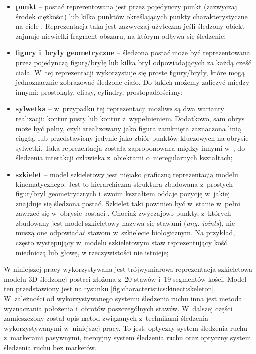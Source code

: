 \begin{itemize}
	\item \textbf{punkt} -- postać reprezentowana jest przez pojedynczy punkt (zazwyczaj środek ciężkości) \cite{Veenman2001} lub kilka punktów określających punkty charakterystyczne na ciele \cite{Serby2004}. Reprezentacja taka jest zazwyczaj użyteczna jeśli śledzony obiekt zajmuje niewielki fragment obszaru, na którym odbywa się śledzenie;
	\item \textbf{figury i~bryły geometryczne} -- śledzona postać może być reprezentowana przez pojedynczą figurę/bryłę \cite{Comaniciu2003} lub kilka brył odpowiadających za każdą cześć ciała. W~tej reprezentacji wykorzystuje się proste figury/bryły, które mogą jednoznacznie zobrazować śledzone ciało. Do takich możemy zaliczyć między innymi: prostokąty, elipsy, cylindry, prostopadłościany;
	\item \textbf{sylwetka} -- w~przypadku tej reprezentacji możliwe są dwa warianty realizacji: kontur pusty lub kontur z~wypełnieniem. Dodatkowo, sam obrys może być pełny, czyli zrealizowany jako figura zamknięta zaznaczona linią ciągłą, lub przedstawiony jedynie jako zbiór punktów kluczowych na obrysie sylwetki. Taka reprezentacja została zaproponowana między innymi w~\cite{Yilmaz2004}, do śledzenia interakcji człowieka z~obiektami o~nieregularnych kształtach;
	\item \textbf{szkielet} -- model szkieletowy jest niejako graficzną reprezentacją modelu kinematycznego. Jest to hierarchiczna struktura zbudowana z~prostych figur/brył geometrycznych i~swoim kształtem oddaje pozycję w~jakiej znajduje się śledzona postać. Szkielet taki powinien być w~stanie w~pełni zawrzeć się w~obrysie postaci \cite{Ali2001}. Chociaż zwyczajowo punkty, z~których zbudowany jest model szkieletowy nazywa się stawami (\emph{ang. joints}), nie muszą one odpowiadać stawom w~szkielecie biologicznym. Na przykład, często występujący w~modelu szkieletowym staw reprezentujący kość miedniczą lub głowę, w rzeczywistości nie istnieje;
\end{itemize}
															
W niniejszej pracy wykorzystywana jest trójwymiarowa reprezentacja szkieletowa modelu 3D śledzonej postaci złożona z~20 stawów i~19 segmentów kości. Model ten przedstawiony jest na rysunku \ref{fig:characteristics:kinect:skeleton}. W~zależności od wykorzystywanego systemu śledzenia ruchu inna jest metoda wyznaczania położenia i~obrotów poszczególnych stawów. W~dalszej części zamieszczony został opis metod związanych z~technikami śledzenia wykorzystywanymi w~niniejszej pracy. To jest: optyczny system śledzenia ruchu z~markerami pasywnymi, inercyjny system śledzenia ruchu oraz optyczny system śledzenia ruchu bez markerów.

